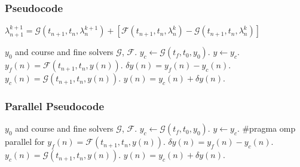 \documentclass[pdf,12pt]{beamer}
\newcommand{\course}{\mathcal{G}}
\newcommand{\fine}{\mathcal{F}}
\begin{document}
\begin{frame}
  \frametitle{Pseudocode}
  $\lambda_{n+1}^{k+1} = \mathcal{G}(t_{n+1},t_n,\lambda_n^{k+1}) + \left[
    \mathcal{F}(t_{n+1},t_n,\lambda_n^k) - \mathcal{G}(t_{n+1},t_n,\lambda_n^k)
    \right]$
  \begin{algorithmic}
    \Require $y_0$ and course and fine solvers $\course$, $\fine$.
    \State $y_c \gets \course(t_f, t_0, y_0)$.
    \State $y \gets y_c$.
        \State $y_f(n) = \fine(t_{n+1},t_n,y(n))$.
        \State $\delta y(n) = y_f(n) - y_c(n)$.
      \EndFor
        \State $y_c(n) = \course(t_{n+1},t_n,y(n))$.
        \State $y(n) = y_c(n) + \delta y(n)$.
      \EndFor
    \EndWhile
  \end{algorithmic}
\end{frame}

\begin{frame}
  \frametitle{Parallel Pseudocode}
  \begin{algorithmic}
    \Require $y_0$ and course and fine solvers $\course$, $\fine$.
    \State $y_c \gets \course(t_f, t_0, y_0)$.
    \State $y \gets y_c$.
      \State \#pragma omp parallel for
        \State $y_f(n) = \fine(t_{n+1},t_n,y(n))$.
        \State $\delta y(n) = y_f(n) - y_c(n)$.
      \EndFor
        \State $y_c(n) = \course(t_{n+1},t_n,y(n))$.
        \State $y(n) = y_c(n) + \delta y(n)$.
      \EndFor
    \EndWhile
  \end{algorithmic}
\end{frame}
\end{document}
